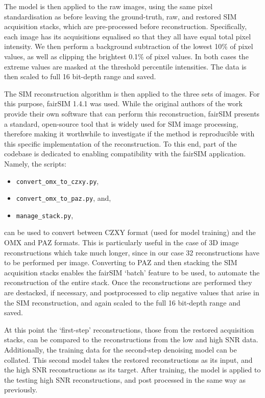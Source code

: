 \documentclass[12pt]{article}
\begin{document}
The model is then applied to the raw images, using the same pixel standardisation as before
leaving the ground-truth, raw, and restored SIM acquisition stacks,
which are pre-processed before reconstruction.
Specifically, each image has its acquisitions equalised so that they all have equal total pixel intensity.
We then perform a background subtraction of the lowest 10\% of pixel values, as well as clipping the brightest 0.1\% of pixel values.
In both cases the extreme values are masked at the threshold percentile intensities.
The data is then scaled to full 16 bit-depth range and saved.

The SIM reconstruction algorithm is then applied to the three sets of images.
For this purpose, fairSIM 1.4.1 \cite{fairSIM} was used.
While the original authors of the work provide their own software that can perform this reconstruction,
fairSIM presents a standard, open-source tool that is widely used for SIM image processing,
therefore making it worthwhile to investigate if the method is reproducible with this specific implementation of the reconstruction.
To this end, part of the codebase is dedicated to enabling compatibility with the fairSIM application.
Namely, the scripts:
\begin{itemize}
    \item \texttt{convert\_omx\_to\_czxy.py},
    \item \texttt{convert\_omx\_to\_paz.py}, and,
    \item \texttt{manage\_stack.py},
\end{itemize}
can be used to convert between CZXY format (used for model training) and the OMX and PAZ formats.
This is particularly useful in the case of 3D image reconstructions which take much longer,
since in our case 32 reconstructions have to be performed per image.
Converting to PAZ and then stacking the SIM acquisition stacks enables the fairSIM `batch' feature to be used,
to automate the reconstruction of the entire stack.
Once the reconstructions are performed they are destacked,
if necessary, and postprocessed to clip negative values that arise in the SIM reconstruction,
and again scaled to the full 16 bit-depth range and saved.

At this point the `first-step' reconstructions, those from the restored acquisition stacks,
can be compared to the reconstructions from the low and high SNR data.
Additionally, the training data for the second-step denoising model can be collated.
This second model takes the restored reconstructions as its input, and the high SNR reconstructions as its target.
After training, the model is applied to the testing high SNR reconstructions, and post processed in the same way as previously.
\end{document}
